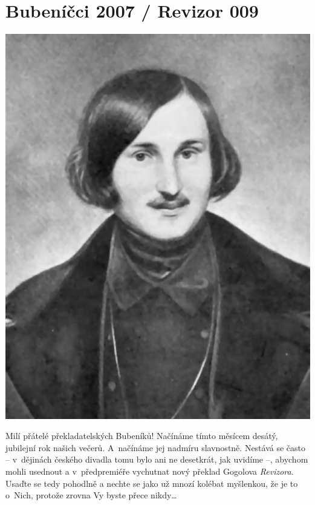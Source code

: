 
\section{Bubeníčci 2007 / Revizor 009}

\begin{center}
 \includegraphics{plavrevue-39/src/gogol.jpg}
 \end{center}

\bigskip

\noindent
Milí přátelé překladatelských Bubeníků! Načínáme tímto měsícem desátý, jubilejní rok našich večerů. A~načínáme jej nadmíru slavnostně. Nestává se často – v dějinách českého divadla tomu bylo ani ne  desetkrát, jak uvidíme –, abychom mohli usednout a v předpremiéře vychutnat nový překlad Gogolova \textit{Revizora}. Usaďte se tedy pohodlně a nechte se jako už mnozí kolébat myšlenkou, že je to o~Nich, protože zrovna Vy byste přece nikdy\ldots

